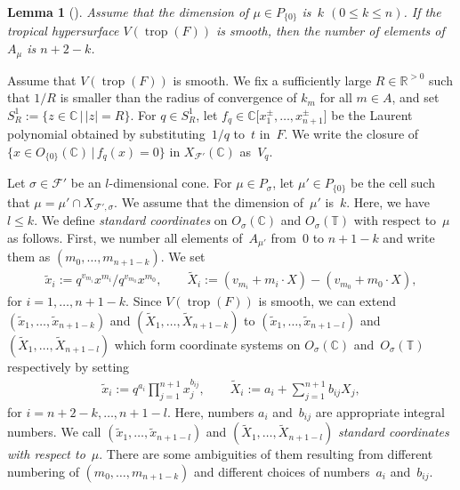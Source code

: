 \documentclass[10pt,a4paper]{amsart}
\numberwithin{equation}{section}
\newtheorem{Lemma}[Theorem]{Lemma}
\begin{document}
\begin{Lemma}[] Assume that the dimension of $\mu \in P_{\{0\}}$ is~$k$ $(0 \leq k \leq n)$. If the tropical hypersurface $V(\operatorname{trop}(F))$ is smooth, then the number of elements of $A_\mu$ is $n+2-k$.
\end{Lemma}

Assume that $V(\operatorname{trop}(F))$ is smooth. We f\/ix a suf\/f\/iciently large $R \in {\mathbb R}^{>0}$ such that $1/R$ is smaller than the radius of convergence of $k_m$ for all $m \in A$, and set $S_R^1 := \{ z \in {\mathbb C} \,|\, |z|=R \}$. For $q \in S_R^1$, let $f_q \in {\mathbb C}\big[x^\pm_{1}, \dots,x^\pm_{n+1}\big]$ be the Laurent polynomial obtained by substituting~$1/q$ to~$t$ in~$F$. We write the closure of $\big\{ x \in O_{\{0\}}({\mathbb C}) \,|\, f_q(x)=0 \big\}$ in $X_{{\mathcal F}'}({\mathbb C})$ as~$V_q$.

Let $\sigma \in {\mathcal F}'$ be an $l$-dimensional cone. For $\mu \in P_\sigma$, let $\mu' \in P_{\{0\}}$ be the cell such that $\mu = \mu' \cap X_{{\mathcal F}',\sigma}$. We assume that the dimension of~$\mu'$ is~$k$. Here, we have $l \leq k$. We def\/ine \textit{standard coordinates} on $O_\sigma({\mathbb C})$ and $O_\sigma({\mathbb T})$ with respect to~$\mu$ as follows. First, we number all elements of~$A_{\mu'}$ from~$0$ to $n+1-k$ and write them as $(m_0, \dots, m_{n+1-k})$. We set
\begin{gather*}%
\tilde{x}_i:=q^{v_{m_i}}x^{m_i}/q^{v_{m_0}}x^{m_0},\qquad \widetilde{X}_i :=(v_{m_{i}}+{m_i} \cdot X)-(v_{m_{0}}+{m_0} \cdot X),
\end{gather*}
for $i=1,\dots, n+1-k$. Since $V(\operatorname{trop}(F))$ is smooth, we can extend $(\tilde{x}_1, \dots, \tilde{x}_{n+1-k})$ and $(\widetilde{X}_1, \dots, \widetilde{X}_{n+1-k})$ to $(\tilde{x}_1, \dots, \tilde{x}_{n+1-l})$ and $(\widetilde{X}_1, \dots, \widetilde{X}_{n+1-l})$ which form coordinate systems on $O_\sigma({\mathbb C})$ and~$O_\sigma({\mathbb T})$ respectively by setting
\begin{gather*}
\tilde{x}_i :=q^{a_i} \prod_{j=1}^{n+1}x_j^{b_{ij}},\qquad \widetilde{X}_i :=a_i+\sum_{j=1}^{n+1} b_{ij}X_j,
\end{gather*}
for $i=n+2-k,\dots, n+1-l$. Here, numbers $a_i$ and~$b_{ij}$ are appropriate integral numbers. We call $(\tilde{x}_1, \dots, \tilde{x}_{n+1-l})$ and $(\widetilde{X}_1, \dots, \widetilde{X}_{n+1-l})$ \textit{standard coordinates with respect to}~$\mu$. There are some ambiguities of them resulting from dif\/ferent numbering of $(m_0, \dots, m_{n+1-k})$ and dif\/ferent choices of numbers~$a_i$ and~$b_{ij}$.
\end{document}
